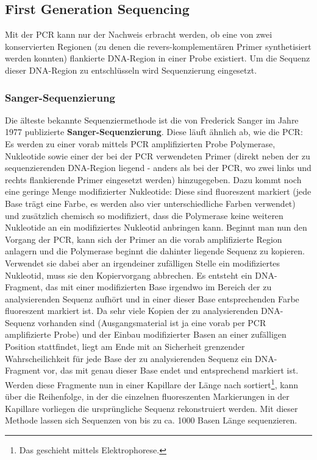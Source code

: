 \subsection{First Generation Sequencing}

Mit der PCR kann nur der Nachweis erbracht werden, ob eine von zwei konservierten Regionen (zu denen die revers-komplementären Primer synthetisiert werden konnten) flankierte DNA-Region in einer Probe existiert. Um die Sequenz dieser DNA-Region zu entschlüsseln wird Sequenzierung eingesetzt. 

\subsubsection{Sanger-Sequenzierung}

Die älteste bekannte Sequenziermethode ist die von Frederick Sanger im Jahre 1977 publizierte \textbf{Sanger-Sequenzierung}. Diese läuft ähnlich ab, wie die PCR: Es werden zu einer vorab mittels PCR amplifizierten Probe Polymerase, Nukleotide sowie einer der bei der PCR verwendeten Primer (direkt neben der zu sequenzierenden DNA-Region liegend - anders als bei der PCR, wo zwei links und rechts flankierende Primer eingesetzt werden) hinzugegeben. Dazu kommt noch eine geringe Menge modifizierter Nukleotide: Diese sind fluoreszent markiert (jede Base trägt eine Farbe, es werden also vier unterschiedliche Farben verwendet) und zusätzlich chemisch so modifiziert, dass die Polymerase keine weiteren Nukleotide an ein modifiziertes Nukleotid anbringen kann. Beginnt man nun den Vorgang der PCR, kann sich der Primer an die vorab amplifizierte Region anlagern und die Polymerase beginnt die dahinter liegende Sequenz zu kopieren. Verwendet sie dabei aber an irgendeiner zufälligen Stelle ein modifiziertes Nukleotid, muss sie den Kopiervorgang abbrechen. Es entsteht ein DNA-Fragment, das mit einer modifizierten Base irgendwo im Bereich der zu analysierenden Sequenz aufhört und in einer dieser Base entsprechenden Farbe fluoreszent markiert ist. Da sehr viele Kopien der zu analysierenden DNA-Sequenz vorhanden sind (Ausgangsmaterial ist ja eine vorab per PCR amplifizierte Probe) und der Einbau modifizierter Basen an einer zufälligen Position stattfindet, liegt am Ende mit an Sicherheit grenzender Wahrscheilichkeit für jede Base der zu analysierenden Sequenz ein DNA-Fragment vor, das mit genau dieser Base endet und entsprechend markiert ist. Werden diese Fragmente nun in einer Kapillare der Länge nach sortiert\footnote{Das geschieht mittels Elektrophorese.}, kann über die Reihenfolge, in der die einzelnen fluoreszenten Markierungen in der Kapillare vorliegen die ursprüngliche Sequenz rekonstruiert werden. Mit dieser Methode lassen sich Sequenzen von bis zu ca. 1000 Basen Länge sequenzieren. 

